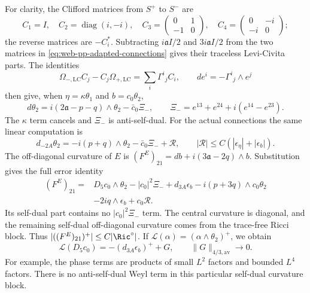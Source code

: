 For clarity, the Clifford matrices from \(S^+\) to \(S^-\) are
\[
 C_1=I,\quad C_2=\operatorname{diag}(i,-i),\quad
 C_3=\begin{pmatrix}0&1\\-1&0\end{pmatrix},\quad
 C_4=\begin{pmatrix}0&-i\\-i&0\end{pmatrix};
\]
the reverse matrices are \(-C_i^*\).  Subtracting
\(i\mathfrak a I/2\) and \(3i\mathfrak a I/2\) from the two
matrices in \eqref{eq:web-pp-adapted-connections} gives their traceless
Levi-Civita parts.  The identities
\[
 \Omega_{-,\mathrm{LC}}C_j-C_j\Omega_{+,\mathrm{LC}}
   =\sum_i\Gamma^i{}_jC_i,\qquad
 de^i=-\Gamma^i{}_j\wedge e^j
\]
then give, when \(\eta=\kappa\theta_1\) and \(b=c_0\theta_2\),
\[
 d\theta_2=i(2\mathfrak a-p-q)\wedge\theta_2-\bar c_0\Xi_-,
 \qquad
 \Xi_-=e^{13}+e^{24}+i(e^{14}-e^{23}).
\]
The \(\kappa\) term cancels and \(\Xi_-\) is anti-self-dual.
For the actual connections the same linear computation is
\begin{equation}
 d_{-2A}\theta_2=-i(p+q)\wedge\theta_2-\bar c_0\Xi_-+\mathcal R,
 \qquad |\mathcal R|\le C(|\epsilon_\eta|+|\epsilon_b|).
 \label{eq:web-pp-cartan}
\end{equation}
The off-diagonal curvature of \(E\) is
\((F^E)_{21}=db+i(3\mathfrak a-2q)\wedge b\).  Substitution gives the
full error identity
\begin{equation}
 \begin{split}
 (F^E)_{21}={}&D_5c_0\wedge\theta_2-|c_0|^2\Xi_-
       +d_{3A}\epsilon_b-i(p+3q)\wedge c_0\theta_2\\
       &-2iq\wedge\epsilon_b+c_0\mathcal R.
 \end{split}
 \label{eq:web-pp-offdiagonal-curvature}
\end{equation}
Its self-dual part contains no \(|c_0|^2\Xi_-\) term.  The central
curvature is diagonal, and the remaining self-dual off-diagonal curvature
comes from the trace-free Ricci block.  Thus
\(\lvert((F^E)_{21})^+\rvert\le C|\Ric^\circ|\).  If
\(\mathcal L(\alpha)=(\alpha\wedge\theta_2)^+\), we obtain
\begin{equation}
 \mathcal L(D_5c_0)=-(d_{3A}\epsilon_b)^++G,
 \qquad \|G\|_{4/3,\mathrm{av}}\longrightarrow0.
 \label{eq:web-pp-local-cr}
\end{equation}
For example, the phase terms are products of small \(L^2\) factors and
bounded \(L^4\) factors.  There is no anti-self-dual Weyl term in this
particular self-dual curvature block.

